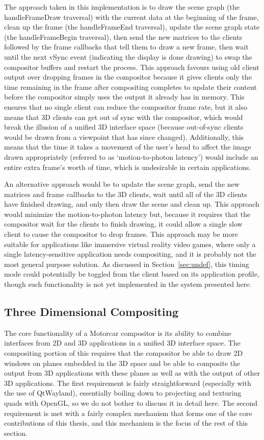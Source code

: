 The approach taken in this implementation is to draw the scene graph (the handleFrameDraw traversal) with the current data at the beginning of the frame, clean up the frame (the handleFrameEnd traversal), update the scene graph state (the handleFrameBegin traversal), then send the new matrices to the clients followed by the frame callbacks that tell them to draw a new frame, then wait until the next vSync event (indicating the display is done drawing) to swap the compositor buffers and restart the process. This approach favours using old client output over dropping frames in the compositor because it gives clients only the time remaining in the frame after compositing completes to update their content before the compositor simply uses the output it already has in memory. This ensures that no single client can reduce the compositor frame rate, but it also means that 3D clients can get out of sync with the compositor, which would break the illusion of a unified 3D interface space (because out-of-sync clients would be drawn from a viewpoint that has since changed). Additionally, this means that the time it takes a movement of the user's head to affect the image drawn appropriately (referred to as `motion-to-photon latency') would include an entire extra frame's worth of time, which is undesirable in certain applications.

An alternative approach would be to update the scene graph, send the new matrices and frame callbacks to the 3D clients, wait until all of the 3D clients have finished drawing, and only then draw the scene and clean up. This approach would minimize the motion-to-photon latency but, because it requires that the compositor wait for the clients to finish drawing, it could allow a single slow client to cause the compositor to drop frames. This approach may be more suitable for applications like immersive virtual reality video games, where only a single latency-sensitive application needs compositing, and it is probably not the most general purpose solution. As discussed in Section~\ref{sec:undef}, this timing mode could potentially be toggled from the client based on its application profile, though such functionality is not yet implemented in the system presented here.

\subsection{Three Dimensional Compositing}
\label{sec:3d-compositing}

The core functionality of a Motorcar compositor is its ability to combine interfaces from 2D and 3D applications in a unified 3D interface space. The compositing portion of this requires that the compositor be able to draw 2D windows on planes embedded in the 3D space and be able to composite the output from 3D applications with these planes as well as with the output of other 3D applications. The first requirement is fairly straightforward (especially with the use of QtWayland), essentially boiling down to projecting and texturing quads with OpenGL, so we do not bother to discuss it in detail here. The second requirement is met with a fairly complex mechanism that forms one of the core contributions of this thesis, and this mechanism is the focus of the rest of this section.

